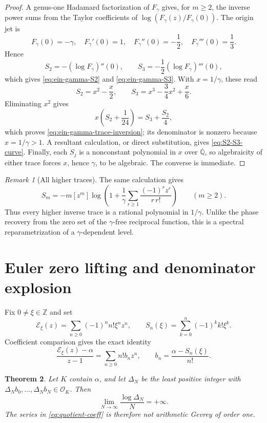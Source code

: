 \documentclass[11pt]{article}
\newtheorem{theorem}{Theorem}[section]
\theoremstyle{definition}
\theoremstyle{remark}
\newtheorem{remark}[theorem]{Remark}
\newcommand{\Qbar}{\overline{\mathbb Q}}
\newcommand{\Z}{\mathbb Z}
\newcommand{\Eul}{\mathcal E}
\newcommand{\OO}{\mathcal O}
\begin{document}
\begin{proof}
A genus-one Hadamard factorization of \(F_\gamma\) gives, for \(m\ge2\),
the inverse power sums from the Taylor coefficients of
\(\log(F_\gamma(z)/F_\gamma(0))\).  The origin jet is
\[
 F_\gamma(0)=-\gamma,\quad
 F_\gamma'(0)=1,\quad
 F_\gamma''(0)=-\frac12,\quad
 F_\gamma'''(0)=\frac13.
\]
Hence
\[
 S_2=-\left(\log F_\gamma\right)''(0),
 \qquad
 S_3=-\frac12\left(\log F_\gamma\right)'''(0),
\]
which gives \eqref{eq:ein-gamma-S2} and
\eqref{eq:ein-gamma-S3}.  With \(x=1/\gamma\), these read
\[
 S_2=x^2-\frac x2,
 \qquad
 S_3=x^3-\frac34x^2+\frac x6.
\]
Eliminating \(x^2\) gives
\[
 x\left(S_2+\frac1{24}\right)=S_3+\frac{S_2}{4},
\]
which proves \eqref{eq:ein-gamma-trace-inversion}; its denominator is
nonzero because \(x=1/\gamma>1\).  A resultant calculation, or direct
substitution, gives \eqref{eq:S2-S3-curve}.  Finally, each \(S_j\) is a
nonconstant polynomial in \(x\) over \(\Qbar\), so algebraicity of either
trace forces \(x\), hence \(\gamma\), to be algebraic.  The converse is
immediate.
\end{proof}

\begin{remark}[All higher traces]
The same calculation gives
\[
 S_m=-m[z^m]\log\left(
  1+\frac1\gamma\sum_{r\ge1}
       \frac{(-1)^r z^r}{r\,r!}\right)
 \qquad(m\ge2).
\]
Thus every higher inverse trace is a rational polynomial in \(1/\gamma\).
Unlike the phase recovery from the zero set of the \(\gamma\)-free
reciprocal function, this is a spectral reparametrization of a
\(\gamma\)-dependent level.
\end{remark}

\section{Euler zero lifting and denominator explosion}

Fix \(0\ne\xi\in\Z\) and set
\[
 \Eul_\xi(z)=\sum_{n\ge0}(-1)^n n!\xi^nz^n,
 \qquad
 S_n(\xi)=\sum_{k=0}^n(-1)^k k!\xi^k.
\]
Coefficient comparison gives the exact identity
\begin{equation}\label{eq:quotient-coeff}
 \frac{\Eul_\xi(z)-\alpha}{z-1}
 =\sum_{n\ge0}n!b_nz^n,\qquad
 b_n=\frac{\alpha-S_n(\xi)}{n!}.
\end{equation}

\begin{theorem}\label{thm:denominator}
Let \(K\) contain \(\alpha\), and let \(\Delta_N\) be the least positive
integer with \(\Delta_Nb_0,\ldots,\Delta_Nb_N\in\OO_K\).  Then
\[
 \lim_{N\to\infty}\frac{\log\Delta_N}{N}=+\infty.
\]
The series in \eqref{eq:quotient-coeff} is therefore not arithmetic Gevrey of
order one.
\end{theorem}
\end{document}
